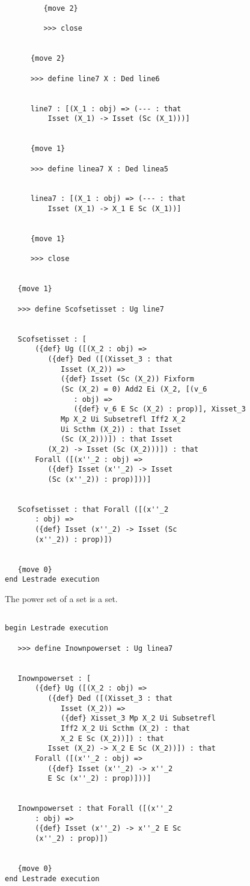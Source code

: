 \documentclass[12pt]{article}
\begin{document}
\begin{verbatim}
         {move 2}

         >>> close


      {move 2}

      >>> define line7 X : Ded line6


      line7 : [(X_1 : obj) => (--- : that 
          Isset (X_1) -> Isset (Sc (X_1)))]


      {move 1}

      >>> define linea7 X : Ded linea5


      linea7 : [(X_1 : obj) => (--- : that 
          Isset (X_1) -> X_1 E Sc (X_1))]


      {move 1}

      >>> close


   {move 1}

   >>> define Scofsetisset : Ug line7


   Scofsetisset : [
       ({def} Ug ([(X_2 : obj) => 
          ({def} Ded ([(Xisset_3 : that 
             Isset (X_2)) => 
             ({def} Isset (Sc (X_2)) Fixform 
             (Sc (X_2) = 0) Add2 Ei (X_2, [(v_6 
                : obj) => 
                ({def} v_6 E Sc (X_2) : prop)], Xisset_3 
             Mp X_2 Ui Subsetrefl Iff2 X_2 
             Ui Scthm (X_2)) : that Isset 
             (Sc (X_2)))]) : that Isset 
          (X_2) -> Isset (Sc (X_2)))]) : that 
       Forall ([(x''_2 : obj) => 
          ({def} Isset (x''_2) -> Isset 
          (Sc (x''_2)) : prop)]))]


   Scofsetisset : that Forall ([(x''_2 
       : obj) => 
       ({def} Isset (x''_2) -> Isset (Sc 
       (x''_2)) : prop)])


   {move 0}
end Lestrade execution
\end{verbatim}

The power set of a set is a set.

\begin{verbatim}

begin Lestrade execution

   >>> define Inownpowerset : Ug linea7


   Inownpowerset : [
       ({def} Ug ([(X_2 : obj) => 
          ({def} Ded ([(Xisset_3 : that 
             Isset (X_2)) => 
             ({def} Xisset_3 Mp X_2 Ui Subsetrefl 
             Iff2 X_2 Ui Scthm (X_2) : that 
             X_2 E Sc (X_2))]) : that 
          Isset (X_2) -> X_2 E Sc (X_2))]) : that 
       Forall ([(x''_2 : obj) => 
          ({def} Isset (x''_2) -> x''_2 
          E Sc (x''_2) : prop)]))]


   Inownpowerset : that Forall ([(x''_2 
       : obj) => 
       ({def} Isset (x''_2) -> x''_2 E Sc 
       (x''_2) : prop)])


   {move 0}
end Lestrade execution
\end{verbatim}
\end{document}

